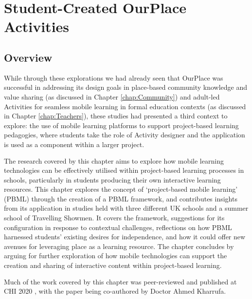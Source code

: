 \chapter{Student-Created OurPlace Activities}
\label{chap:student-created}

\section{Overview}
While through these explorations we had already seen that OurPlace was successful in addressing its design goals in place-based community knowledge and value sharing (as discussed in Chapter \ref{chap:Community}) and adult-led Activities for seamless mobile learning in formal education contexts (as discussed in Chapter \ref{chap:Teachers}), these studies had presented a third context to explore: the use of mobile learning platforms to support project-based learning pedagogies, where students take the role of Activity designer and the application is used as a component within a larger project.

The research covered by this chapter aims to explore how mobile learning technologies can be effectively utilised within project-based learning processes in schools, particularly in students producing their own interactive learning resources. This chapter explores the concept of `project-based mobile learning' (PBML) through the creation of a PBML framework, and contributes insights from its application in studies held with three different UK schools and a summer school of Travelling Showmen. It covers the framework, suggestions for its configuration in response to contextual challenges, reflections on how PBML harnessed students' existing desires for independence, and how it could offer new avenues for leveraging place as a learning resource. The chapter concludes by arguing for further exploration of how mobile technologies can support the creation and sharing of interactive content within project-based learning.

Much  of the work covered by this chapter was peer-reviewed and published at CHI 2020 \citep{Richardson2020}, with the paper being co-authored by Doctor Ahmed Kharrufa.

